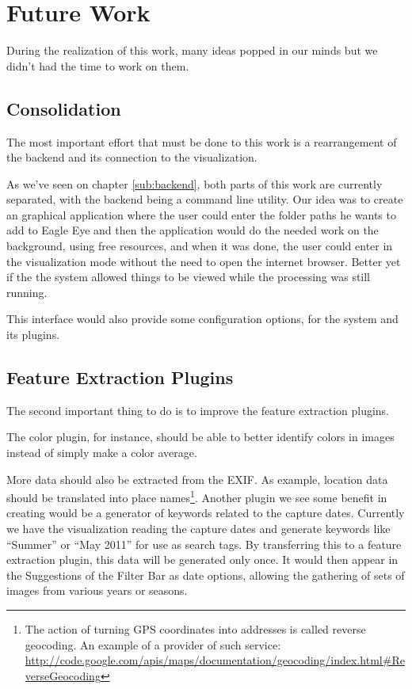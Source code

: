 \section{Future Work} %
\label{future_work}

During the realization of this work, many ideas popped in our minds but we didn't had the time to work on them.

\subsection{Consolidation} %
\label{sec:consolidation}

The most important effort that must be done to this work is a rearrangement of the backend and its connection to the visualization.

As we've seen on chapter \ref{sub:backend}, both parts of this work are currently separated, with the backend being a command line utility. Our idea was to create an graphical application where the user could enter the folder paths he wants to add to Eagle Eye and then the application would do the needed work on the background, using free resources, and when it was done, the user could enter in the visualization mode without the need to open the internet browser. Better yet if the the system allowed things to be viewed while the processing was still running.

This interface would also provide some configuration options, for the system and its plugins.


\subsection{Feature Extraction Plugins} %
\label{sec:feature_extraction}

The second important thing to do is to improve the feature extraction plugins.

The color plugin, for instance, should be able to better identify colors in images instead of simply make a color average.

More data should also be extracted from the EXIF. As example, location data should be translated into place names\footnote{The action of turning GPS coordinates into addresses is called reverse geocoding. An example of a provider of such service: \url{http://code.google.com/apis/maps/documentation/geocoding/index.html\#ReverseGeocoding}}. Another plugin we see some benefit in creating would be a generator of keywords related to the capture dates. Currently we have the visualization reading the capture dates and generate keywords like ``Summer'' or ``May 2011'' for use as search tags. By transferring this to a feature extraction plugin, this data will be generated only once. It would then appear in the Suggestions of the Filter Bar as date options, allowing the gathering of sets of images from various years or seasons.

